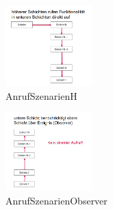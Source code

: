 \documentclass[../ZF_SWEN1.tex]{subfiles}
\begin{document}
\begin{multicols}{2}

\begin{figure}[H]			\includegraphics[width=0.3\textwidth] {Resources/Images/AnrufSzenarienH.png}
\caption{\label{fig:AnrufSzenarienH}AnrufSzenarienH}
\end{figure}


\columnbreak


\begin{figure}[H]			\includegraphics[width=0.3\textwidth] {Resources/Images/AnrufSzenarienObserver.png}
\caption{\label{fig:AnrufSzenarienObserver}AnrufSzenarienObserver}
\end{figure}

\end{multicols}
\end{document}
